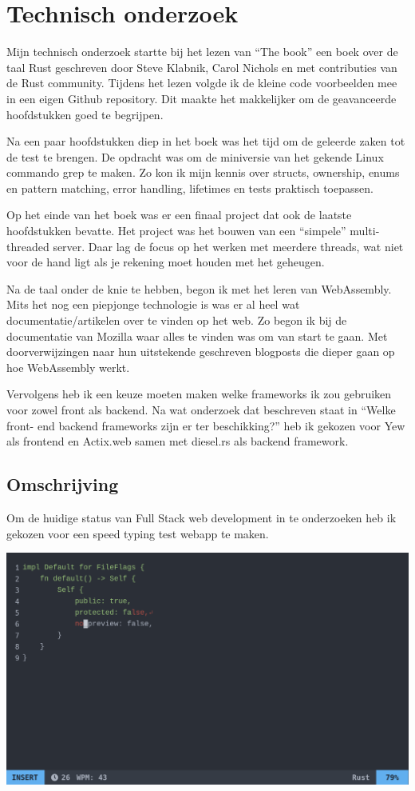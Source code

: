 \chapter{Technisch onderzoek}

Mijn technisch onderzoek startte bij het lezen van “The book” een boek over de taal Rust geschreven
door Steve Klabnik, Carol Nichols en met contributies van de Rust community. Tijdens het lezen
volgde ik de kleine code voorbeelden mee in een eigen Github repository. Dit maakte het makkelijker
om de geavanceerde hoofdstukken goed te begrijpen. 

Na een paar hoofdstukken diep in het boek was het tijd om de geleerde zaken tot de test te brengen.
De opdracht was om de miniversie van het gekende Linux commando grep te maken. Zo kon ik mijn kennis
over structs, ownership, enums en pattern matching, error handling, lifetimes en tests praktisch
toepassen.  

Op het einde van het boek was er een finaal project dat ook de laatste hoofdstukken bevatte. Het
project was het bouwen van een “simpele” multi-threaded server. Daar lag de focus op het werken met
meerdere threads, wat niet voor de hand ligt als je rekening moet houden met het geheugen. 

Na de taal onder de knie te hebben, begon ik met het leren van WebAssembly. Mits het nog een
piepjonge technologie is was er al heel wat documentatie/artikelen over te vinden op het web. Zo
begon ik bij de documentatie van Mozilla waar alles te vinden was om van start te gaan. Met
doorverwijzingen naar hun uitstekende geschreven blogposts die dieper gaan op hoe WebAssembly werkt. 

Vervolgens heb ik een keuze moeten maken welke frameworks ik zou gebruiken voor zowel front als
backend. Na wat onderzoek dat beschreven staat in “Welke front- end backend frameworks zijn er ter
beschikking?” heb ik gekozen voor Yew als frontend en Actix.web samen met diesel.rs als backend
framework.

\clearpage

\section{Omschrijving}

Om de huidige status van Full Stack web development in te onderzoeken heb ik gekozen voor een speed
typing test webapp te maken.

\includegraphics[width=\textwidth]{./figures/vim.png}

